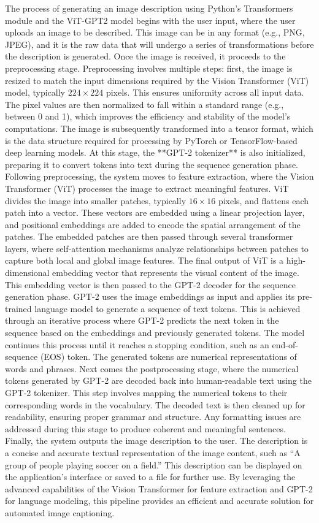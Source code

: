 \noindent
The process of generating an image description using Python’s Transformers module and the ViT-GPT2 model begins with the user input, where the user uploads an image to be described. This image can be in any format (e.g., PNG, JPEG), and it is the raw data that will undergo a series of transformations before the description is generated. Once the image is received, it proceeds to the preprocessing stage. Preprocessing involves multiple steps: first, the image is resized to match the input dimensions required by the Vision Transformer (ViT) model, typically \(224 \times 224\) pixels. This ensures uniformity across all input data. The pixel values are then normalized to fall within a standard range (e.g., between 0 and 1), which improves the efficiency and stability of the model's computations. The image is subsequently transformed into a tensor format, which is the data structure required for processing by PyTorch or TensorFlow-based deep learning models. At this stage, the **GPT-2 tokenizer** is also initialized, preparing it to convert tokens into text during the sequence generation phase. Following preprocessing, the system moves to feature extraction, where the Vision Transformer (ViT) processes the image to extract meaningful features. ViT divides the image into smaller patches, typically \(16 \times 16\) pixels, and flattens each patch into a vector. These vectors are embedded using a linear projection layer, and positional embeddings are added to encode the spatial arrangement of the patches. The embedded patches are then passed through several transformer layers, where self-attention mechanisms analyze relationships between patches to capture both local and global image features. The final output of ViT is a high-dimensional embedding vector that represents the visual content of the image. This embedding vector is then passed to the GPT-2 decoder for the sequence generation phase. GPT-2 uses the image embeddings as input and applies its pre-trained language model to generate a sequence of text tokens. This is achieved through an iterative process where GPT-2 predicts the next token in the sequence based on the embeddings and previously generated tokens. The model continues this process until it reaches a stopping condition, such as an end-of-sequence (EOS) token. The generated tokens are numerical representations of words and phrases. Next comes the postprocessing stage, where the numerical tokens generated by GPT-2 are decoded back into human-readable text using the GPT-2 tokenizer. This step involves mapping the numerical tokens to their corresponding words in the vocabulary. The decoded text is then cleaned up for readability, ensuring proper grammar and structure. Any formatting issues are addressed during this stage to produce coherent and meaningful sentences. Finally, the system outputs the image description to the user. The description is a concise and accurate textual representation of the image content, such as “A group of people playing soccer on a field.” This description can be displayed on the application’s interface or saved to a file for further use. By leveraging the advanced capabilities of the Vision Transformer for feature extraction and GPT-2 for language modeling, this pipeline provides an efficient and accurate solution for automated image captioning.


